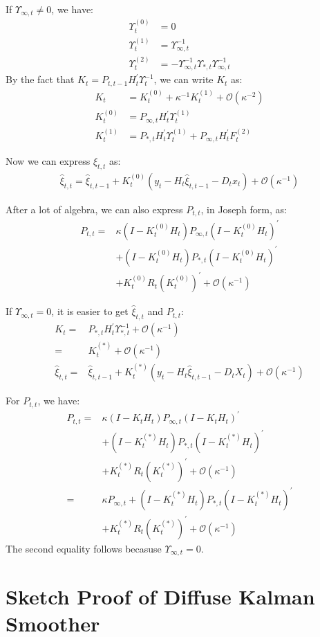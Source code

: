 \documentclass[12pt]{article}
\numberwithin{equation}{section}
\begin{document}
If $\Upsilon_{\infty,t}\neq 0$, we have:
\begin{align*}
    \Upsilon_t^{(0)} &= 0 \\
    \Upsilon_t^{(1)} &= \Upsilon_{\infty,t}^{-1} \\
    \Upsilon_t^{(2)} &= -\Upsilon_{\infty,t}^{-1}\Upsilon_{*,t}\Upsilon_{\infty,t}^{-1}
\end{align*}
By the fact that $K_t = P_{t,t-1}H_t^{'}\Upsilon_t^{-1}$, we can write $K_t$ as:
\begin{align}
    K_t &= K_t^{(0)} + \kappa^{-1}K_t^{(1)} + \mathcal{O}(\kappa^{-2}) \label{eq:K1_diffuse_start} \\
    K_t^{(0)} &= P_{\infty,t}H_t^{'}\Upsilon_t^{(1)} \\
    K_t^{(1)} &= P_{*,t}H_t^{'}\Upsilon_t^{(1)} + P_{\infty,t}H_t^{'}F_t^{(2)} \label{eq:K1_diffuse_end}
\end{align}

Now we can express $\hat{\xi}_{t,t}$ as:
\begin{align}
    \hat{\xi}_{t,t} = \hat{\xi}_{t,t-1} + K_t^{(0)}(y_t-H_t\hat{\xi}_{t,t-1}-D_tx_t) + \mathcal{O}(\kappa^{-1}) \label{eq:diff_xi1}
\end{align}

After a lot of algebra, we can also express $P_{t,t}$, in Joseph form, as:
\begin{align}
    P_{t,t} =& \kappa (I-K_t^{(0)}H_t)P_{\infty,t}(I-K_t^{(0)}H_t)^{'} \nonumber \\
    &+(I-K_t^{(0)}H_t)P_{*,t}(I-K_t^{(0)}H_t)^{'} \label{eq:diff_P1} \\
    &+K_t^{(0)}R_t(K_t^{(0)})^{'} + \mathcal{O}(\kappa^{-1}) \nonumber
\end{align}

If $\Upsilon_{\infty,t}=0$, it is easier to get $\hat{\xi}_{t,t}$ and $P_{t,t}$:
\begin{align}
    K_t =& P_{*,t}H_t^{'}\Upsilon_{*,t}^{-1} + \mathcal{O}(\kappa^{-1}) \nonumber \\
    =& K_t^{(*)} + \mathcal{O}(\kappa^{-1}) \label{eq:K2_diffuse} \\
    \hat{\xi}_{t,t} =& \hat{\xi}_{t,t-1} + K_t^{(*)}(y_t - H_t\hat{\xi}_{t,t-1} - D_tX_t) + \mathcal{O}(\kappa^{-1}) \label{eq:diff_xi2}
\end{align}

For $P_{t,t}$, we have:
\begin{align}
    P_{t,t} =& \kappa(I-K_tH_t)P_{\infty,t}(I-K_tH_t)^{'} \nonumber \\
    &+ (I-K_t^{(*)}H_t)P_{*,t}(I-K_t^{(*)}H_t)^{'} \nonumber \\
    &+ K_t^{(*)}R_t(K_t^{(*)})^{'} + \mathcal{O}(\kappa^{-1}) \nonumber \\
    =& \kappa P_{\infty, t} + (I-K_t^{(*)}H_t)P_{*,t}(I-K_t^{(*)}H_t)^{'} \nonumber \\
    &+ K_t^{(*)}R_t(K_t^{(*)})^{'} + \mathcal{O}(\kappa^{-1}) \label{eq:diff_P2}
\end{align}
The second equality follows becasuse $\Upsilon_{\infty,t}=0$.

\section{Sketch Proof of Diffuse Kalman Smoother} \label{ap:init_smoother}
\end{document}
